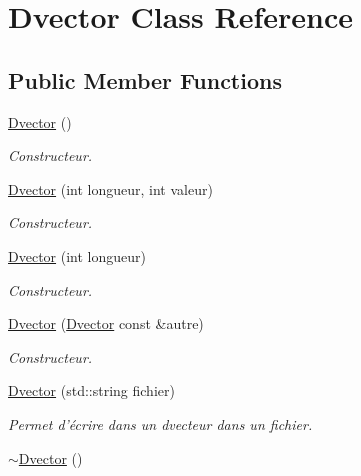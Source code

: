 \hypertarget{classDvector}{\section{Dvector Class Reference}
\label{classDvector}
}
\subsection*{Public Member Functions}
\begin{DoxyCompactItemize}
\item 
\hypertarget{classDvector_adf0f620df0feef3311f7d198e649a298}{\hyperlink{classDvector_adf0f620df0feef3311f7d198e649a298}{Dvector} ()}\label{classDvector_adf0f620df0feef3311f7d198e649a298}

\begin{DoxyCompactList}\small\item\em Constructeur. \end{DoxyCompactList}\item 
\hyperlink{classDvector_a613d5e3f0102d46f16d86650d48d9e43}{Dvector} (int longueur, int valeur)
\begin{DoxyCompactList}\small\item\em Constructeur. \end{DoxyCompactList}\item 
\hyperlink{classDvector_a42eb49f338cbf649e4360035c72f9fe2}{Dvector} (int longueur)
\begin{DoxyCompactList}\small\item\em Constructeur. \end{DoxyCompactList}\item 
\hyperlink{classDvector_acfdd0c5c022184d9a0163a3cb8dc3730}{Dvector} (\hyperlink{classDvector}{Dvector} const \&autre)
\begin{DoxyCompactList}\small\item\em Constructeur. \end{DoxyCompactList}\item 
\hyperlink{classDvector_a2f2c20eb463fe2fd695493b5d6871244}{Dvector} (std\-::string fichier)
\begin{DoxyCompactList}\small\item\em Permet d'écrire dans un dvecteur dans un fichier. \end{DoxyCompactList}\item 
\hypertarget{classDvector_a3156d0776c5da1a15685970200ec6b96}{\hyperlink{classDvector_a3156d0776c5da1a15685970200ec6b96}{$\sim$\-Dvector} ()}\label{classDvector_a3156d0776c5da1a15685970200ec6b96}


\end{DoxyCompactItemize}
